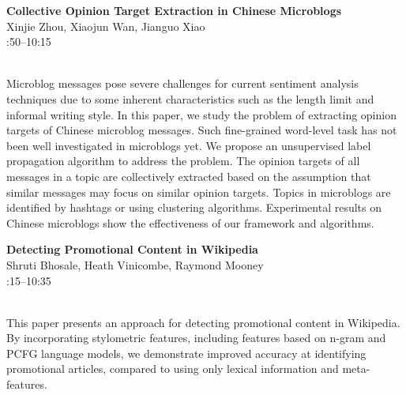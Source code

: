 \documentclass[twoside,makeidx]{book}
\renewcommand{\normalsize}{\fontsize{8}{9}\selectfont}
\renewcommand{\small}{\fontsize{7}{8}\selectfont}
\begin{document}
\par\vspace{2em}\noindent%
\begin{minipage}{\linewidth}%
\begin{center}
\textbf{\normalsize Collective Opinion Target Extraction in Chinese Microblogs}\\
\normalsize  Xinjie Zhou,  Xiaojun Wan,  Jianguo Xiao\\
{\small 9:50--10:15}\\
\end{center}
\end{minipage}\\[0.5em]
\nopagebreak%
\noindent%
{\small Microblog messages pose severe challenges for current sentiment analysis techniques due to some inherent characteristics such as the length limit and informal writing style. In this paper, we study the problem of extracting opinion targets of Chinese microblog messages. Such fine-grained word-level task has not been well investigated in microblogs yet. We propose an unsupervised label propagation algorithm to address the problem. The opinion targets of all messages in a topic are collectively extracted based on the assumption that similar messages may focus on similar opinion targets. Topics in microblogs are identified by hashtags or using clustering algorithms. Experimental results on Chinese microblogs show the effectiveness of our framework and algorithms.}
\par\vspace{2em}\noindent%
\begin{minipage}{\linewidth}%
\begin{center}
\textbf{\normalsize Detecting Promotional Content in Wikipedia}\\
\normalsize  Shruti Bhosale,  Heath Vinicombe,  Raymond Mooney\\
{\small 10:15--10:35}\\
\end{center}
\end{minipage}\\[0.5em]
\nopagebreak%
\noindent%
{\small This paper presents an approach for detecting promotional content in Wikipedia. By incorporating stylometric features, including features based on n-gram and PCFG language models, we demonstrate improved accuracy at identifying promotional articles, compared to using only lexical information and meta-features.}
\clearpage
\end{document}
